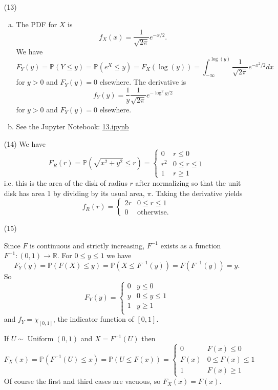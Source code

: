 \documentclass[10pt]{article}
\newcommand{\R}{\mathbb{R}}
\renewcommand{\P}{\mathbb{P}}
\newcommand{\Unif}{\operatorname{Uniform}}
\begin{document}
\begin{enumerate}
\item[(13)]

\begin{enumerate}[(a)]
\item The PDF for $X$ is
\[
f_X(x)=\frac{1}{\sqrt{2\pi}}e^{-x/2}.
\]
We have
\[
F_Y(y)=\P(Y\leq y)=\P(e^X\leq y)=F_X(\log(y))=
\int_{-\infty}^{\log(y)} \frac{1}{\sqrt{2\pi}}e^{-x^2/2}dx
\]
for $y>0$ and $F_Y(y)=0$ elsewhere.
The derivative is
\[
f_Y(y) = \frac{1}{y}\frac{1}{\sqrt{2\pi}}e^{-\log^2y/2}
\]
for $y>0$ and $F_Y(y)=0$ elsewhere.

\item

See the Jupyter Notebook:
\href{https://github.com/ajrasmus/some_of_statistics/blob/main/chapter_2/13.ipynb}{13.ipynb}
\end{enumerate}

\item[(14)]
We have
\[
F_R(r) = \P(\sqrt{x^2+y^2}\leq r)=
\begin{cases}
0 & r \leq 0 \\
r^2 & 0 \leq r \leq 1 \\
1 & r \geq 1
\end{cases}
\]
i.e. this is the area of the disk of radius $r$ after normalizing so that the
unit disk has area 1 by dividing by its usual area, $\pi$.
Taking the derivative yields
\[
f_R(r) = \begin{cases}
2r & 0\leq r \leq 1 \\
0 & \text{otherwise}.
\end{cases}
\]

\item[(15)]

Since $F$ is continuous and strictly increasing, $F^{-1}$ exists as a function
$F^{-1}:(0,1)\to \R$. For $0\leq y \leq 1$ we have
\[
F_Y(y) = \P(F(X) \leq y) = \P(X \leq F^{-1}(y)) = F(F^{-1}(y))=y.
\]
So
\[
F_Y(y) =
\begin{cases}
0 & y \leq 0 \\
y & 0\leq y\leq 1 \\
1 & y\geq 1 \\
\end{cases}
\]
and $f_Y = \chi_{[0,1]}$, the indicator function of $[0,1]$.

If $U\sim \Unif(0,1)$ and $X=F^{-1}(U)$ then
\[
F_X(x) = \P(F^{-1}(U) \leq x) = \P(U \leq F(x)) =
\begin{cases}
0 & F(x) \leq 0 \\
F(x) & 0\leq F(x) \leq 1 \\
1 & F(x) \geq 1
\end{cases}
\]
Of course the first and third cases are vacuous, so $F_X(x)=F(x)$.


\end{enumerate}
\end{document}
